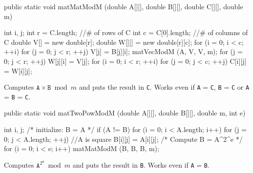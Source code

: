 \begin{code}

   public static void matMatModM (double A[][], double B[][], double C[][],
                                  double m) \begin{hide} {
      int i, j;
      int r = C.length;    //# of rows of C
      int c = C[0].length; //# of columns of C
      double V[] = new double[r];
      double W[][] = new double[r][c];
      for (i = 0; i < c;  ++i) {
         for (j = 0; j < r;  ++j)
            V[j] = B[j][i];
         matVecModM (A, V, V, m);
         for (j = 0; j < r;  ++j)
            W[j][i] = V[j];
      }
      for (i = 0; i < r;  ++i) {
         for (j = 0; j < c;  ++j)
            C[i][j] = W[i][j];
      }
   } \end{hide}
\end{code}
\begin{tabb} Computes $\mathtt{A} \times \mathtt{B} \bmod m$
  and puts the result in
  \texttt{C}. Works even if \texttt{A} = \texttt{C}, \texttt{B} = \texttt{C} or
  \texttt{A} = \texttt{B} = \texttt{C}.
\end{tabb}
\begin{htmlonly}
\end{htmlonly}
\begin{code}

   public static void matTwoPowModM (double A[][], double B[][], double m,
                                     int e) \begin{hide} {
      int i, j;
      /* initialize: B = A */
      if (A != B) {
         for (i = 0; i < A.length; i++) {
            for (j = 0; j < A.length;  ++j)  //A is square
               B[i][j] = A[i][j];
         }
      }
      /* Compute B = A^{2^e} */
      for (i = 0; i < e; i++)
         matMatModM (B, B, B, m);
   } \end{hide}
\end{code}
\begin{tabb} Computes $\mathtt{A}^{2^{\mathtt{e}}} \bmod m$ and
  puts the result in \texttt{B}.
  Works even if \texttt{A} = \texttt{B}.
\end{tabb}
\begin{htmlonly}
\end{htmlonly}
